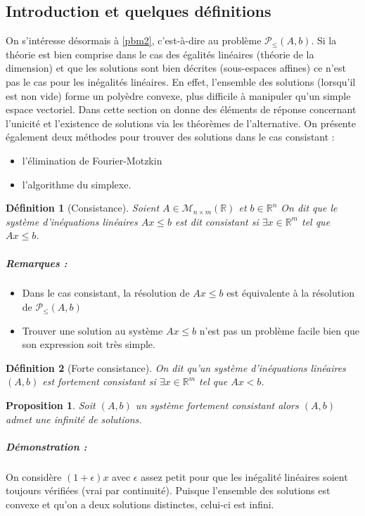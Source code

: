 \documentclass[10pt,a4paper]{article}
\newtheorem{mydef}{Définition}
\newtheorem{prop}{Proposition}
\begin{document}
\subsection{Introduction et quelques définitions}

On s'intéresse désormais à \ref{pbm2}, c'est-à-dire au problème $\mathcal{P}_{\le}(A,b)$. Si la théorie est bien comprise dans le cas des égalités linéaires (théorie de la dimension) et que les solutions sont bien décrites (sous-espaces affines) ce n'est pas le cas pour les inégalités linéaires. En effet, l'ensemble des solutions (lorsqu'il est non vide) forme un polyèdre convexe, plus difficile à manipuler qu'un simple espace vectoriel. Dans cette section on donne des éléments de réponse concernant l'unicité et l'existence de solutions via les théorèmes de l'alternative. On présente également deux méthodes pour trouver des solutions dans le cas consistant :
\begin{itemize}
\item l'élimination de Fourier-Motzkin
\item l'algorithme du simplexe.
\end{itemize}

\begin{mydef}[Consistance]
Soient $A \in \mathcal{M}_{n \times m}(\mathbb{R})$ et $b \in \mathbb{R}^n$
On dit que le système d'inéquations linéaires $Ax \leq b$ est dit consistant si $\exists x \in \mathbb{R}^m$ tel que $Ax \le b$.
\end{mydef}
\subparagraph{Remarques :}
\begin{itemize}
  \item Dans le cas consistant, la résolution de $Ax \leq b$ est équivalente à la résolution de $\mathcal{P}_{\leq}(A, b)$
  \item Trouver une solution au système $Ax \leq b$ n'est pas un problème facile bien que son expression soit très simple.
\end{itemize}

\begin{mydef}[Forte consistance]
On dit qu'un système d'inéquations linéaires $(A,b)$ est fortement consistant si $\exists x \in \mathbb{R}^m$ tel que $Ax < b$.
\end{mydef}

\begin{prop}
Soit $(A,b)$ un système fortement consistant alors $(A,b)$ admet une infinité de solutions.
\end{prop}
\subparagraph{Démonstration :} On considère $(1+\epsilon) x$ avec $\epsilon$ assez petit pour que les inégalité linéaires soient toujours vérifiées (vrai par continuité).
Puisque l'ensemble des solutions est convexe et qu'on a deux solutions distinctes, celui-ci est infini.
\end{document}
